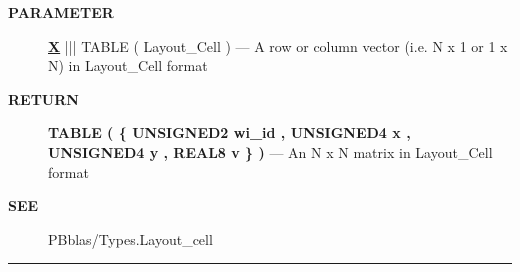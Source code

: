 \par
\begin{description}
\item [\colorbox{tagtype}{\color{white} \textbf{\textsf{PARAMETER}}}] \textbf{\underline{X}} ||| TABLE ( Layout\_Cell ) --- A row or column vector (i.e. N x 1 or 1 x N) in Layout\_Cell format
\end{description}







\par
\begin{description}
\item [\colorbox{tagtype}{\color{white} \textbf{\textsf{RETURN}}}] \textbf{TABLE ( \{ UNSIGNED2 wi\_id , UNSIGNED4 x , UNSIGNED4 y , REAL8 v \} )} --- An N x N matrix in Layout\_Cell format
\end{description}






\par
\begin{description}
\item [\colorbox{tagtype}{\color{white} \textbf{\textsf{SEE}}}] PBblas/Types.Layout\_cell
\end{description}




\rule{\linewidth}{0.5pt}
